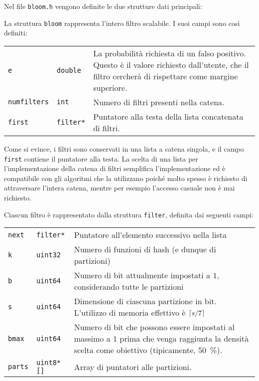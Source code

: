 Nel file \verb|bloom.h| vengono definite le due strutture dati principali:



La struttura \verb|bloom| rappresenta l'intero filtro scalabile. I suoi campi sono
così definiti:

\medskip
\begin{tabular}{ |l|l|p{280px}| }
  \hline
  \verb|e| & \verb|double| & La probabilità richiesta di un falso positivo. Questo è il valore richiesto
  dall'utente, che il filtro cercherà di rispettare come margine superiore. \\

  \verb|numfilters| & \verb|int| & Numero di filtri presenti nella catena. \\

  \verb|first| & \verb|filter*| & Puntatore alla testa della lista concatenata di filtri. \\
  \hline
\end{tabular}
\medskip

Come si evince, i filtri sono conservati in una lista a catena singola, e il campo \verb|first|
contiene il puntatore alla testa. La scelta di una lista per l'implementazione della catena di
filtri semplifica l'implementazione ed è compatibile con gli algoritmi che la utilizzano poiché
molto spesso è richiesto di attraversare l'intera catena, mentre per esempio l'accesso casuale non è
mai richiesto.

Ciascun filtro è rappresentato dalla struttura \verb|filter|, definita dai seguenti campi:

\medskip
\begin{tabular}{ |l|l|p{280px}| }
  \hline

  \verb|next| & \verb|filter*| & Puntatore all'elemento successivo nella lista \\

  \verb|k| & \verb|uint32| & Numero di funzioni di hash (e dunque di partizioni) \\

  \verb|b| & \verb|uint64| & Numero di bit attualmente impostati a $1$, considerando tutte le partizioni \\

  \verb|s| & \verb|uint64| & Dimensione di ciascuna partizione in bit. L'utilizzo di memoria
  effettivo è $\lceil s/7\rceil$ \\

  \verb|bmax| & \verb|uint64| & Numero di bit che possono essere impostati al massimo a $1$ prima
  che venga raggiunta la densità scelta come obiettivo (tipicamente, \SI{50}{\percent}). \\

  \verb|parts| & \verb|uint8*[]| & Array di puntatori alle partizioni. \\

  \hline
\end{tabular}
\medskip

